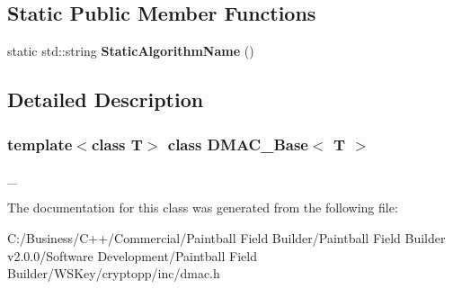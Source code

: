 \subsection*{Static Public Member Functions}
\begin{DoxyCompactItemize}
\item 
\hypertarget{class_d_m_a_c___base_aa351afda43a6f3d3d90debc1e0de89e6}{
static std::string {\bfseries StaticAlgorithmName} ()}
\label{class_d_m_a_c___base_aa351afda43a6f3d3d90debc1e0de89e6}

\end{DoxyCompactItemize}


\subsection{Detailed Description}
\subsubsection*{template$<$class T$>$ class DMAC\_\-Base$<$ T $>$}

\_\- 

The documentation for this class was generated from the following file:\begin{DoxyCompactItemize}
\item 
C:/Business/C++/Commercial/Paintball Field Builder/Paintball Field Builder v2.0.0/Software Development/Paintball Field Builder/WSKey/cryptopp/inc/dmac.h\end{DoxyCompactItemize}
